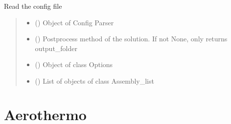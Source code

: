 \documentclass[letterpaper,10pt,english]{sphinxmanual}
\begin{document}
\begin{fulllineitems}
\label{\detokenize{modules:configuration.read_config_file}}
\pysigstartsignatures
{}
\pysigstopsignatures
\sphinxAtStartPar
Read the config file
\begin{quote}\begin{description}
\begin{itemize}
\item {} 
\sphinxAtStartPar
{} () \textendash{} Object of Config Parser

\item {} 
\sphinxAtStartPar
{} () \textendash{} Postprocess method of the solution. If not None, only returns output\_folder

\end{itemize}

\sphinxAtStartPar
\begin{itemize}
\item {} 
\sphinxAtStartPar
{} () \textendash{} Object of class Options

\item {} 
\sphinxAtStartPar
{} () \textendash{} List of objects of class Assembly\_list

\end{itemize}


\end{description}\end{quote}

\end{fulllineitems}



\section{Aerothermo}
\label{\detokenize{modules:aerothermo}}
\end{document}
